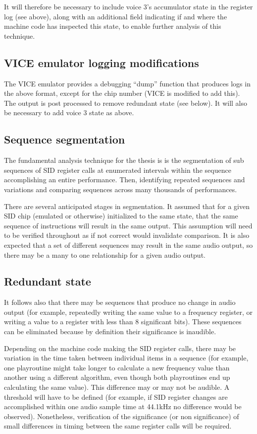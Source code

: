 \documentclass[10pt]{article}
\begin{document}
\begin{multicols*}{2}
  It will therefore be necessary to include voice 3's accumulator
  state in the register log (see above), along with an additional
  field indicating if and where the machine code has inspected this
  state, to enable further analysis of this technique.

  \subsection{VICE emulator logging modifications}
  The VICE emulator provides a debugging ``dump'' function that
  produces logs in the above format, except for the chip number
  (VICE is modified to add this).  The output is post processed
  to remove redundant state (see below).  It will also be
  necessary to add voice 3 state as above.

  \subsection{Sequence segmentation}
  The fundamental analysis technique for the thesis is
  is the segmentation of sub sequences of SID register calls at
  enumerated intervals within the sequence accomplishing an entire
  performance. Then, identifying repeated sequences and variations and
  comparing sequences across many thousands of performances.

  There are several anticipated stages in segmentation. It assumed
  that for a given SID chip (emulated or otherwise) initialized to the
  same state, that the same sequence of instructions will result in
  the same output. This assumption will need to be verified throughout
  as if not correct would invalidate comparison. It is also expected
  that a set of different sequences may result in the same audio
  output, so there may be a many to one relationship for a given audio
  output.

  \subsection{Redundant state}
  It follows also that there may be sequences that produce no change
  in audio output (for example, repeatedly writing the same value to a
  frequency register, or writing a value to a register with less than
  8 significant bits). These sequences can be eliminated because by
  definition their significance is inaudible.

  Depending on the machine code making the SID register calls, there
  may be variation in the time taken between individual items in a
  sequence (for example, one playroutine might take longer to calculate a
  new frequency value than another using a different algorithm, even
  though both playroutines end up calculating the same value). This
  difference may or may not be audible. A threshold will have to be
  defined (for example, if SID register changes are accomplished
  within one audio sample time at 44.1kHz no difference would be
  observed).  Nonetheless, verification of the significance (or non
  significance) of small differences in timing between the same
  register calls will be required.


\end{multicols*}
\end{document}
